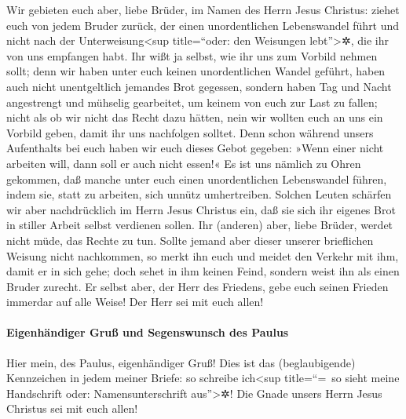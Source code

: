  Wir gebieten euch aber, liebe Brüder, im Namen des Herrn
Jesus Christus: ziehet euch von jedem Bruder zurück, der einen
unordentlichen Lebenswandel führt und nicht nach der
Unterweisung\textless sup title=``oder: den Weisungen
lebt''\textgreater✲, die ihr von uns empfangen habt.  Ihr
wißt ja selbst, wie ihr uns zum Vorbild nehmen sollt; denn wir haben
unter euch keinen unordentlichen Wandel geführt,  haben
auch nicht unentgeltlich jemandes Brot gegessen, sondern haben Tag und
Nacht angestrengt und mühselig gearbeitet, um keinem von euch zur Last
zu fallen;  nicht als ob wir nicht das Recht dazu hätten,
nein wir wollten euch an uns ein Vorbild geben, damit ihr uns nachfolgen
solltet.  Denn schon während unsers Aufenthalts bei euch
haben wir euch dieses Gebot gegeben: »Wenn einer nicht arbeiten will,
dann soll er auch nicht essen!«  Es ist uns nämlich zu
Ohren gekommen, daß manche unter euch einen unordentlichen Lebenswandel
führen, indem sie, statt zu arbeiten, sich unnütz umhertreiben.
 Solchen Leuten schärfen wir aber nachdrücklich im Herrn
Jesus Christus ein, daß sie sich ihr eigenes Brot in stiller Arbeit
selbst verdienen sollen.  Ihr (anderen) aber, liebe
Brüder, werdet nicht müde, das Rechte zu tun.  Sollte
jemand aber dieser unserer brieflichen Weisung nicht nachkommen, so
merkt ihn euch und meidet den Verkehr mit ihm, damit er in sich gehe;
 doch sehet in ihm keinen Feind, sondern weist ihn als
einen Bruder zurecht.  Er selbst aber, der Herr des
Friedens, gebe euch seinen Frieden immerdar auf alle Weise! Der Herr sei
mit euch allen!

\hypertarget{eigenhuxe4ndiger-gruuxdf-und-segenswunsch-des-paulus}{%
\paragraph{Eigenhändiger Gruß und Segenswunsch des
Paulus}\label{eigenhuxe4ndiger-gruuxdf-und-segenswunsch-des-paulus}}

 Hier mein, des Paulus, eigenhändiger Gruß! Dies ist das
(beglaubigende) Kennzeichen in jedem meiner Briefe: so schreibe
ich\textless sup title=``=~so sieht meine Handschrift oder:
Namensunterschrift aus''\textgreater✲!  Die Gnade unsers
Herrn Jesus Christus sei mit euch allen!
